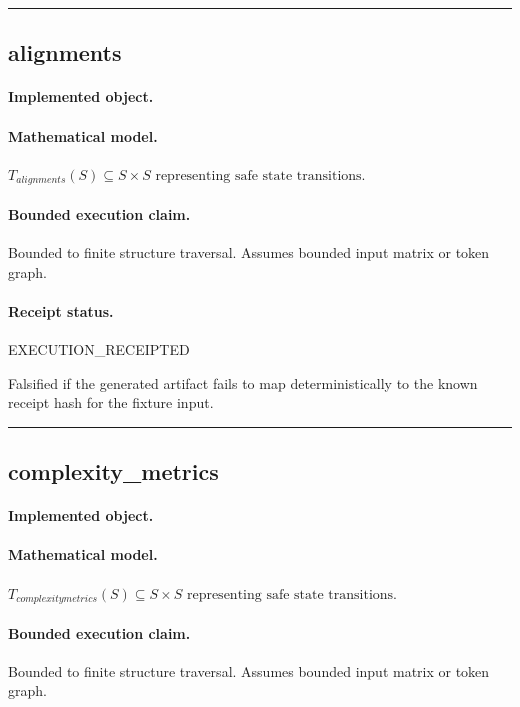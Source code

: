 \vspace{1em}\hrule\vspace{1em}
\subsection{alignments}
\paragraph{Implemented object.} 
\paragraph{Mathematical model.} $T_{alignments}(S) \subseteq S \times S \text{ representing safe state transitions}.$
\paragraph{Bounded execution claim.} Bounded to finite structure traversal. Assumes bounded input matrix or token graph.
\paragraph{Receipt status.} EXECUTION\_RECEIPTED
\begin{falsifier}
Falsified if the generated artifact fails to map deterministically to the known receipt hash for the fixture input.
\end{falsifier}

\vspace{1em}\hrule\vspace{1em}
\subsection{complexity\_metrics}
\paragraph{Implemented object.} 
\paragraph{Mathematical model.} $T_{complexitymetrics}(S) \subseteq S \times S \text{ representing safe state transitions}.$
\paragraph{Bounded execution claim.} Bounded to finite structure traversal. Assumes bounded input matrix or token graph.
